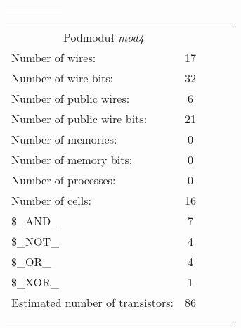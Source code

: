 \begin{table}[!htb]
\begin{minipage}{0.55\linewidth}
\begin{tabular}{lllll}
			&  &  &  &  \\
			&  &  &  & 
		\end{tabular}
	\end{minipage}%
	\begin{minipage}{0.55\linewidth}
		\centering
		\begin{tabular}{lllll}
			\cline{1-2}
			\multicolumn{2}{|c|}{Podmoduł \emph{mod4}} &  &  &  \\ \cline{1-2}
			\multicolumn{1}{|l|}{Number of wires:} & \multicolumn{1}{c|}{17} &  &  &  \\ \cline{1-2}
			\multicolumn{1}{|l|}{Number of wire bits:} & \multicolumn{1}{c|}{32} &  &  &  \\ \cline{1-2}
			\multicolumn{1}{|l|}{Number of public wires:} & \multicolumn{1}{c|}{6} &  &  &  \\ \cline{1-2}
			\multicolumn{1}{|l|}{Number of public wire bits:} & \multicolumn{1}{c|}{21} &  &  &  \\ \cline{1-2}
			\multicolumn{1}{|l|}{Number of memories:} & \multicolumn{1}{c|}{0} &  &  &  \\ \cline{1-2}
			\multicolumn{1}{|l|}{Number of memory bits: } & \multicolumn{1}{c|}{0} &  &  &  \\ \cline{1-2}
			\multicolumn{1}{|l|}{Number of processes: } & \multicolumn{1}{c|}{0} &  &  &  \\ \cline{1-2}
			\multicolumn{1}{|l|}{Number of cells:} & \multicolumn{1}{c|}{16} &  &  &  \\ \cline{1-2}
			\multicolumn{1}{|l|}{\$\_AND\_} & \multicolumn{1}{c|}{7} &  &  &  \\ \cline{1-2}
			\multicolumn{1}{|l|}{\$\_NOT\_} & \multicolumn{1}{c|}{4} &  &  &  \\ \cline{1-2}
			\multicolumn{1}{|l|}{\$\_OR\_} & \multicolumn{1}{c|}{4} &  &  &  \\ \cline{1-2}
			\multicolumn{1}{|l|}{\$\_XOR\_} & \multicolumn{1}{c|}{1} &  &  &  \\ \cline{1-2}
			\multicolumn{1}{|l|}{Estimated number of transistors:} & \multicolumn{1}{c|}{86} &  &  &  \\ \cline{1-2}
			
			&  &  &  &  \\
			&  &  &  & 
		\end{tabular}
	\end{minipage} 
\end{table}

\newpage


